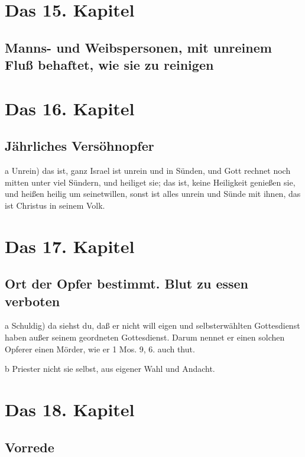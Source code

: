 \chapter{Das 15. Kapitel}

\section[Manns- und Weibspersonen, mit unreinem Fluß behaftet, wie]{Manns- und Weibspersonen, mit unreinem Fluß behaftet, wie sie zu reinigen}

\chapter{Das 16. Kapitel}

\section{Jährliches Versöhnopfer}

a Unrein) das ist, ganz Israel ist unrein und in Sünden, und Gott rechnet noch mitten unter viel Sündern, und heiliget sie; das ist, keine Heiligkeit genießen sie, und heißen heilig um seinetwillen, sonst ist alles unrein und Sünde mit ihnen, das ist Christus in seinem Volk.

\chapter{Das 17. Kapitel}

\section{Ort der Opfer bestimmt. Blut zu essen verboten}

a Schuldig) da siehst du, daß er nicht will eigen und selbsterwählten Gottesdienst haben außer seinem geordneten Gottesdienst. Darum nennet er einen solchen Opferer einen Mörder, wie er 1 Mos. 9, 6. auch thut.

b Priester nicht sie selbst, aus eigener Wahl und Andacht.

\chapter{Das 18. Kapitel}

\section{Vorrede}

